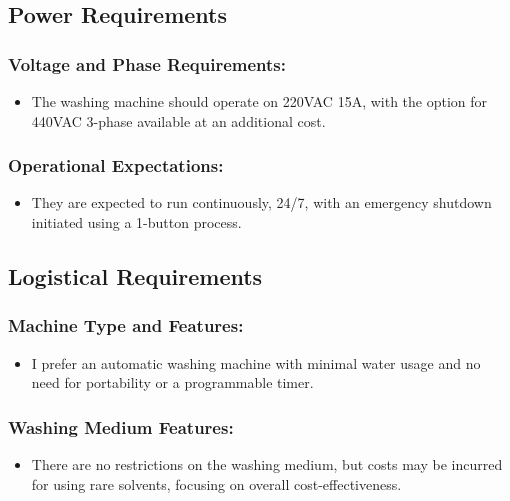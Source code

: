 \documentclass[table]{rapportCS}
\begin{document}
\subsection{ Power Requirements}\label{sec:powerreq}
\subsubsection{Voltage and Phase Requirements:}\label{sec: vnpreq}
    \begin{itemize}[label=$\bullet$]
      \item The washing machine should operate on 220VAC 15A, with the option for 440VAC 3-phase available at an additional cost.
    \end{itemize}
  
  \subsubsection{Operational Expectations:}\label{sec: opexp}
    \begin{itemize}[label=$\bullet$]
      \item They are expected to run continuously, 24/7, with an emergency shutdown initiated using a 1-button process.
    \end{itemize}

\subsection{Logistical Requirements}\label{sec:logireq}
\subsubsection{Machine Type and Features:}\label{sec:machtype}
    \begin{itemize}[label=$\bullet$]
      \item I prefer an automatic washing machine with minimal water usage and no need for portability or a programmable timer.
    \end{itemize}
\subsubsection{Washing Medium Features:}\label{sec:wmtype}
    \begin{itemize}[label=$\bullet$]
      \item There are no restrictions on the washing medium, but costs may be incurred for using rare solvents, focusing on overall cost-effectiveness.
    \end{itemize}
\end{document}
